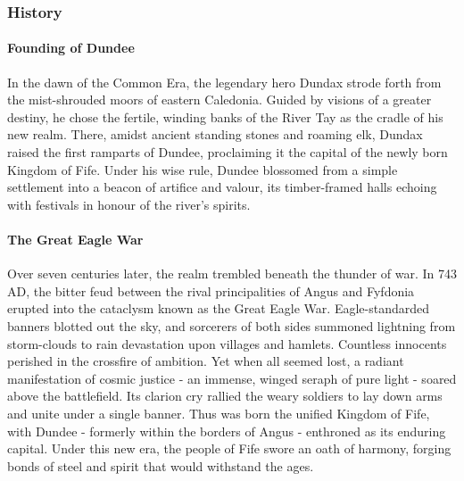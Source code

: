\documentclass[letterpaper,openany,oneside,twocolumn]{book}
\begin{document}
\subsubsection*{History}
{\entryfont\paragraph*{Founding of Dundee} In the dawn of the Common Era, the legendary hero Dundax strode forth from the mist-shrouded moors of eastern Caledonia. Guided by visions of a greater destiny, he chose the fertile, winding banks of the River Tay as the cradle of his new realm. There, amidst ancient standing stones and roaming elk, Dundax raised the first ramparts of Dundee, proclaiming it the capital of the newly born Kingdom of Fife. Under his wise rule, Dundee blossomed from a simple settlement into a beacon of artifice and valour, its timber-framed halls echoing with festivals in honour of the river's spirits.
\paragraph*{The Great Eagle War} Over seven centuries later, the realm trembled beneath the thunder of war. In 743 AD, the bitter feud between the rival principalities of Angus and Fyfdonia erupted into the cataclysm known as the Great Eagle War. Eagle-standarded banners blotted out the sky, and sorcerers of both sides summoned lightning from storm-clouds to rain devastation upon villages and hamlets. Countless innocents perished in the crossfire of ambition. Yet when all seemed lost, a radiant manifestation of cosmic justice - an immense, winged seraph of pure light - soared above the battlefield. Its clarion cry rallied the weary soldiers to lay down arms and unite under a single banner. Thus was born the unified Kingdom of Fife, with Dundee - formerly within the borders of Angus - enthroned as its enduring capital. Under this new era, the people of Fife swore an oath of harmony, forging bonds of steel and spirit that would withstand the ages.}

\vfill\eject
\end{document}
